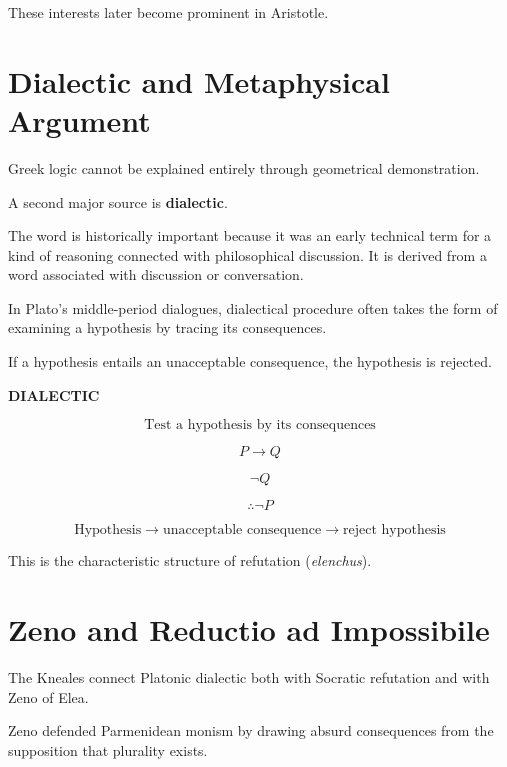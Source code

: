 \documentclass[11pt]{article}
\begin{document}
These interests later become prominent in Aristotle.

\section{Dialectic and Metaphysical Argument}

Greek logic cannot be explained entirely through geometrical
demonstration.

A second major source is \textbf{dialectic}.

The word is historically important because it was an early
technical term for a kind of reasoning connected with
philosophical discussion. It is derived from a word associated
with discussion or conversation.

In Plato's middle-period dialogues, dialectical procedure often
takes the form of examining a hypothesis by tracing its
consequences.

If a hypothesis entails an unacceptable consequence, the
hypothesis is rejected.

\newpage

\begin{whiteboard}
\textbf{DIALECTIC}

\[
\boxed{
\text{Test a hypothesis by its consequences}
}
\]

\[
P\rightarrow Q
\]

\[
\neg Q
\]

\[
\therefore \neg P
\]

\[
\text{Hypothesis}
\rightarrow
\text{unacceptable consequence}
\rightarrow
\text{reject hypothesis}
\]
\end{whiteboard}

This is the characteristic structure of refutation
(\textit{elenchus}).

\section{Zeno and Reductio ad Impossibile}

The Kneales connect Platonic dialectic both with Socratic
refutation and with Zeno of Elea.

Zeno defended Parmenidean monism by drawing absurd
consequences from the supposition that plurality exists.
\end{document}
